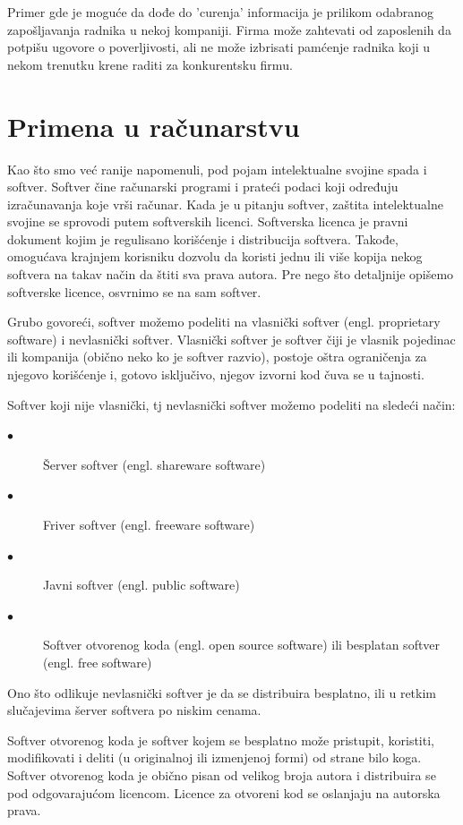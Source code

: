 \documentclass[a4paper]{article}
\begin{document}
Primer gde je moguće da dođe do 'curenja' informacija je prilikom odabranog zapošljavanja radnika u nekoj kompaniji. Firma može zahtevati od zaposlenih da potpišu ugovore o poverljivosti, ali ne može izbrisati pamćenje radnika koji u nekom trenutku krene raditi za konkurentsku firmu.

\section{Primena u računarstvu}
\label{primena_u_racuarstvu}

Kao što smo već ranije napomenuli, pod pojam intelektualne svojine spada i softver.
Softver čine računarski programi i prateći podaci koji određuju izračunavanja koje vrši
računar. \cite{p1} Kada je u pitanju softver, zaštita intelektualne svojine se sprovodi putem
softverskih licenci.
Softverska licenca je pravni dokument kojim je regulisano korišćenje i
distribucija softvera. Takođe, omogućava krajnjem korisniku dozvolu da koristi jednu ili
više kopija nekog softvera na takav način da štiti sva prava autora. Pre nego što detaljnije
opišemo softverske licence, osvrnimo se na sam softver.

Grubo govoreći, softver možemo podeliti na vlasnički softver (engl. proprietary software)
i nevlasnički softver. Vlasnički softver je softver čiji je vlasnik pojedinac ili kompanija
(obično neko ko je softver razvio), postoje oštra ograničenja za njegovo korišćenje i,
gotovo isključivo, njegov izvorni kod čuva se u tajnosti. \cite{p2}

Softver koji nije vlasnički, tj nevlasnički softver možemo podeliti na sledeći način:
    \begin{description}
        \item[$\bullet$] Šerver softver (engl. shareware software)
        \item[$\bullet$] Friver softver (engl. freeware software)
        \item[$\bullet$] Javni softver (engl. public software)
        \item[$\bullet$] Softver otvorenog koda (engl. open source software) ili besplatan softver (engl. free software) 
    \end{description}
Ono što odlikuje nevlasnički softver je da se distribuira besplatno, ili u retkim slučajevima šerver 
softvera po niskim cenama.

Softver otvorenog koda je softver kojem se besplatno može pristupit, koristiti, modifikovati i deliti
(u originalnoj ili izmenjenoj formi) od strane bilo koga. Softver otvorenog koda je obično pisan od velikog
broja autora i distribuira se pod odgovarajućom licencom. Licence za otvoreni kod se oslanjaju na autorska
prava. \cite{p2}
\end{document}
